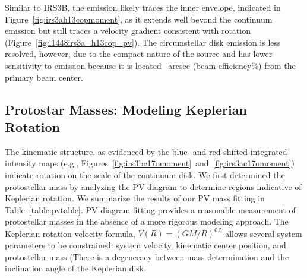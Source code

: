 \documentclass[twocolumn, 12pt, trackchanges]{aastex63}
\begin{document}
Similar to IRS3B, the \htcop\space emission likely traces the inner envelope, indicated in Figure~\ref{fig:irs3ah13copmoment}, as it extends well beyond the continuum emission but still traces a velocity gradient consistent with rotation (Figure~\ref{fig:l1448irs3a_h13cop_pv}). The circumstellar disk emission is less resolved, however, due to the compact nature of the source and has lower sensitivity to emission because it is located ~arcsec (beam efficiency\%) from the primary beam center. 

\subsection{Protostar Masses: Modeling Keplerian Rotation}
The kinematic structure, as evidenced by the blue- and red-shifted integrated intensity maps (e.g., Figures~\ref{fig:irs3bc17omoment}~and~\ref{fig:irs3ac17omoment}) indicate rotation on the scale of the continuum disk. We first determined the protostellar mass by analyzing the PV diagram to determine regions indicative of Keplerian rotation. We summarize the results of our PV mass fitting in Table~\ref{table:pvtable}. PV diagram fitting provides a reasonable measurement of protostellar masses in the absence of a more rigorous modeling approach. The Keplerian rotation-velocity formula, $V(R) = (GM/R)^{0.5}$ allows several system parameters to be constrained: system velocity, kinematic center position, and protostellar mass (There is a degeneracy between mass determination and the inclination angle of the Keplerian disk. 
\end{document}
